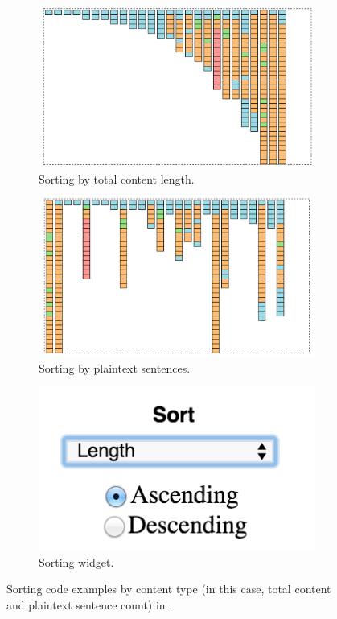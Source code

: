 \begin{figure}[t]
    \centering
    \begin{subfigure}[b]{0.45\columnwidth}
        \includegraphics[width=\textwidth]{figures/length_sorted}
        \caption{Sorting by total content length.}
        \label{fig:length_sorted}
    \end{subfigure}
    \begin{subfigure}[b]{0.45\columnwidth}
        \includegraphics[width=\textwidth]{figures/text_sorted}
        \caption{Sorting by plaintext sentences.}
        \label{fig:text_sorted}
    \end{subfigure}
    \begin{subfigure}[b]{0.3\columnwidth}
        \includegraphics[width=\textwidth]{figures/sort_pane}
        \caption{Sorting widget.}
        \label{fig:sort_pane}
    \end{subfigure}
    \caption{Sorting code examples by content type (in this case, total content and plaintext sentence count) in \systemname{}.}
\end{figure}

